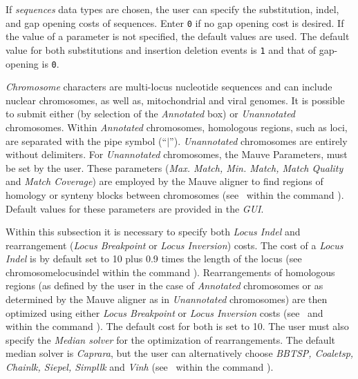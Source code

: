  
\begin{description}
\setlength{\labelsep}{5pt}
\setlength{\itemindent}{0pt}%
\setlength{\parindent}{0.5cm}        
        
	\item [Sequence Parameters]  If \emph{sequences} data types are chosen, the user can specify the 
		substitution, indel, and gap opening costs of sequences. Enter \texttt{0} if no gap opening 
		cost is desired. If the value of a parameter is not specified, the default values are used. 
		The default value for both substitutions and insertion deletion events is \texttt{1} and 
		that of gap-opening is \texttt{0}. 

	\item [Chromosome and Mauve Parameters] \emph{Chromosome} characters are multi-locus 
		nucleotide sequences and can include nuclear chromosomes, as well as, mitochondrial 
		and viral genomes.  It is possible to submit either  (by selection of the 
		\emph{Annotated} box) or \emph{Unannotated} chromosomes. Within \emph{Annotated} 
		chromosomes, homologous regions, such as loci, are separated with the pipe symbol
		(``$\vert$'').  \emph{Unannotated} chromosomes are entirely 
		without delimiters. For \emph{Unannotated} chromosomes, the Mauve Parameters, must be set
		by the user.  These parameters (\emph{Max. Match, Min. Match, Match Quality} and \emph {Match 
		Coverage}) are employed by the Mauve aligner to find regions of homology or synteny blocks 
		 between chromosomes (see~ within the 
		 command ). Default values for these parameters are provided in the \emph{GUI}.
		    	
		\indent Within this subsection it is necessary to specify both \emph{Locus Indel} and rearrangement 
		(\emph{Locus Breakpoint} or \emph{Locus Inversion}) costs.  The cost of a \emph{Locus Indel} 
		is by default set to 10 plus 0.9 times the length of the locus (see~
		{chromosomelocusindel}  within the command ). Rearrangements of 
		homologous regions (as defined by the user in the case of \emph{Annotated} chromosomes 
		or as determined by the Mauve aligner as in \emph{Unannotated} chromosomes) are 
		then optimized using either \emph{Locus Breakpoint} or \emph{Locus Inversion} costs 
		(see~ and
		~ within the command 
		).  The default cost for both is set to 10. The user must also specify the 
		\emph{Median solver} for the optimization of rearrangements. The default median solver is 
		\emph{Caprara}, but the user can alternatively choose \emph{BBTSP, Coaletsp, Chainlk, 
		Siepel, Simpllk} and \emph{Vinh} (see~ 
		within the command 	).
		

\end{description}

